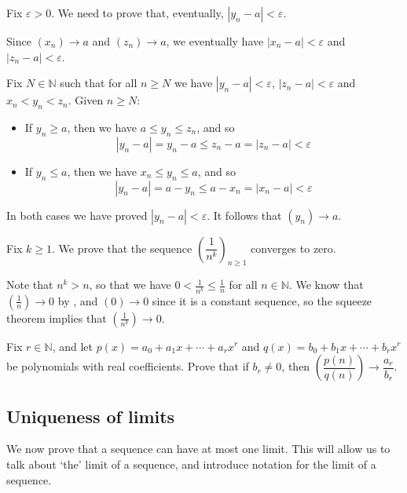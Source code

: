 \begin{cproof}
Fix $\varepsilon > 0$. We need to prove that, eventually, $|y_n - a| < \varepsilon$.

Since $(x_n) \to a$ and $(z_n) \to a$, we eventually have $|x_n - a| < \varepsilon$ and $|z_n - a| < \varepsilon$.

Fix $N \in \mathbb{N}$ such that for all $n \ge N$ we have $|y_n - a| < \varepsilon$, $|z_n - a| < \varepsilon$ and $x_n < y_n < z_n$. Given $n \ge N$:
\begin{itemize}
\item If $y_n \ge a$, then we have $a \le y_n \le z_n$, and so
\[ |y_n-a| = y_n-a \le z_n-a = |z_n-a| < \varepsilon \]
\item If $y_n \le a$, then we have $x_n \le y_n \le a$, and so
\[ |y_n-a| = a-y_n \le a-x_n = |x_n-a| < \varepsilon \]
\end{itemize}
In both cases we have proved $|y_n-a| < \varepsilon$. It follows that $(y_n) \to a$.
\end{cproof}

\begin{example}
\label{exOneOverNPowerK}
Fix $k \ge 1$. We prove that the sequence $\left( \dfrac{1}{n^k} \right)_{n \ge 1}$ converges to zero.

Note that $n^k > n$, so that we have $0 < \frac{1}{n^k} \le \frac{1}{n}$ for all $n \in \mathbb{N}$. We know that $(\frac{1}{n}) \to 0$ by , and $(0) \to 0$ since it is a constant sequence, so the squeeze theorem implies that $(\frac{1}{n^k}) \to 0$.
\end{example}

\begin{exercise}
Fix $r \in \mathbb{N}$, and let $p(x) = a_0 + a_1 x + \cdots + a_r x^r$ and $q(x) = b_0 + b_1 x + \cdots + b_r x^r$ be polynomials with real coefficients. Prove that if $b_r \ne 0$, then $\left( \dfrac{p(n)}{q(n)} \right) \to \dfrac{a_r}{b_r}$.
\end{exercise}

\subsection*{Uniqueness of limits}

We now prove that a sequence can have at most one limit. This will allow us to talk about `the' limit of a sequence, and introduce notation for the limit of a sequence.

